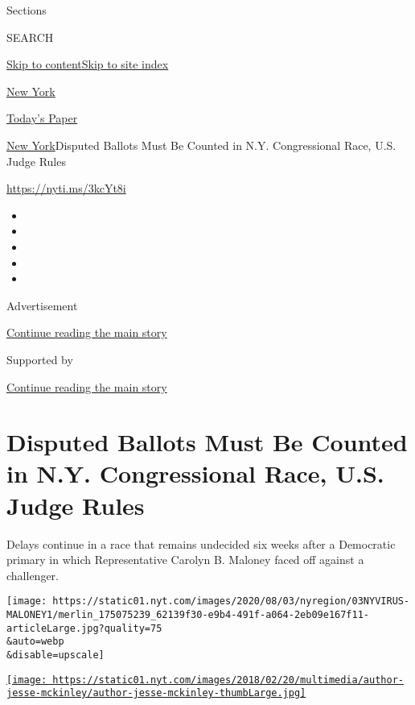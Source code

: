 Sections

SEARCH

\protect\hyperlink{site-content}{Skip to
content}\protect\hyperlink{site-index}{Skip to site index}

\href{https://www.nytimes.com/section/nyregion}{New York}

\href{https://myaccount.nytimes.com/auth/login?response_type=cookie\&client_id=vi}{}

\href{https://www.nytimes.com/section/todayspaper}{Today's Paper}

\href{/section/nyregion}{New York}\textbar{}Disputed Ballots Must Be
Counted in N.Y. Congressional Race, U.S. Judge Rules

\url{https://nyti.ms/3kcYt8i}

\begin{itemize}
\item
\item
\item
\item
\item
\end{itemize}

Advertisement

\protect\hyperlink{after-top}{Continue reading the main story}

Supported by

\protect\hyperlink{after-sponsor}{Continue reading the main story}

\hypertarget{disputed-ballots-must-be-counted-in-ny-congressional-race-us-judge-rules}{%
\section{Disputed Ballots Must Be Counted in N.Y. Congressional Race,
U.S. Judge
Rules}\label{disputed-ballots-must-be-counted-in-ny-congressional-race-us-judge-rules}}

Delays continue in a race that remains undecided six weeks after a
Democratic primary in which Representative Carolyn B. Maloney faced off
against a challenger.

\texttt{[image: https://static01.nyt.com/images/2020/08/03/nyregion/03NYVIRUS-MALONEY1/merlin\_175075239\_62139f30-e9b4-491f-a064-2eb09e167f11-articleLarge.jpg?quality=75\\\&auto=webp\\\&disable=upscale]}

\href{https://www.nytimes.com/by/jesse-mckinley}{\texttt{[image: https://static01.nyt.com/images/2018/02/20/multimedia/author-jesse-mckinley/author-jesse-mckinley-thumbLarge.jpg]}}

